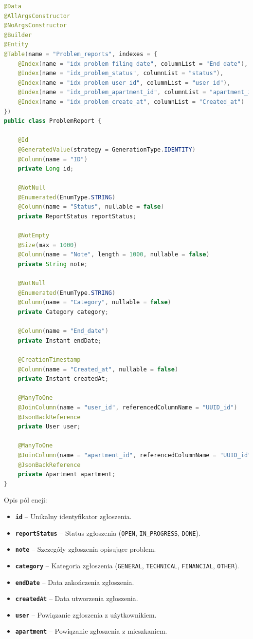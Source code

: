 \begin{lstlisting}[language=Java, style=JavaStyle, caption=Definicja encji \texttt{ProblemReport}]
@Data
@AllArgsConstructor
@NoArgsConstructor
@Builder
@Entity
@Table(name = "Problem_reports", indexes = {
    @Index(name = "idx_problem_filing_date", columnList = "End_date"),
    @Index(name = "idx_problem_status", columnList = "status"),
    @Index(name = "idx_problem_user_id", columnList = "user_id"),
    @Index(name = "idx_problem_apartment_id", columnList = "apartment_id"),
    @Index(name = "idx_problem_create_at", columnList = "Created_at")
})
public class ProblemReport {

    @Id
    @GeneratedValue(strategy = GenerationType.IDENTITY)
    @Column(name = "ID")
    private Long id;

    @NotNull
    @Enumerated(EnumType.STRING)
    @Column(name = "Status", nullable = false)
    private ReportStatus reportStatus;

    @NotEmpty
    @Size(max = 1000)
    @Column(name = "Note", length = 1000, nullable = false)
    private String note;

    @NotNull
    @Enumerated(EnumType.STRING)
    @Column(name = "Category", nullable = false)
    private Category category;

    @Column(name = "End_date")
    private Instant endDate;

    @CreationTimestamp
    @Column(name = "Created_at", nullable = false)
    private Instant createdAt;

    @ManyToOne
    @JoinColumn(name = "user_id", referencedColumnName = "UUID_id")
    @JsonBackReference
    private User user;

    @ManyToOne
    @JoinColumn(name = "apartment_id", referencedColumnName = "UUID_id")
    @JsonBackReference
    private Apartment apartment;
}
\end{lstlisting}

\noindent Opis pól encji:
\begin{itemize}
    \item \textbf{\texttt{id}} -- Unikalny identyfikator zgłoszenia.
    \item \textbf{\texttt{reportStatus}} -- Status zgłoszenia (\texttt{OPEN}, \texttt{IN\_PROGRESS}, \texttt{DONE}).
    \item \textbf{\texttt{note}} -- Szczegóły zgłoszenia opisujące problem.
    \item \textbf{\texttt{category}} -- Kategoria zgłoszenia (\texttt{GENERAL}, \texttt{TECHNICAL}, \texttt{FINANCIAL}, \texttt{OTHER}).
    \item \textbf{\texttt{endDate}} -- Data zakończenia zgłoszenia.
    \item \textbf{\texttt{createdAt}} -- Data utworzenia zgłoszenia.
    \item \textbf{\texttt{user}} -- Powiązanie zgłoszenia z użytkownikiem.
    \item \textbf{\texttt{apartment}} -- Powiązanie zgłoszenia z mieszkaniem.
\end{itemize}

